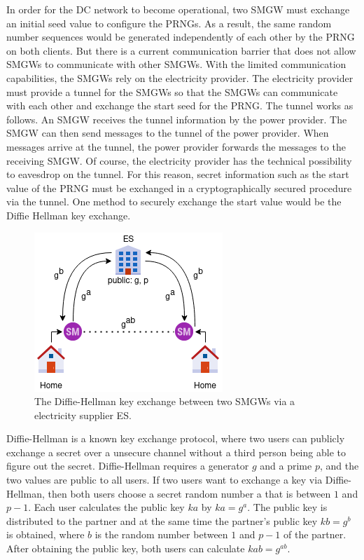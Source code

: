 In order for the DC network to become operational, two \gls{SMGW} must exchange an initial seed value to configure the PRNGs. %
As a result, the same random number sequences would be generated independently of each other by the PRNG on both clients. But there is a current communication barrier that does not allow \gls{SMGW}s to communicate with other \gls{SMGW}s. With the limited communication capabilities, the \gls{SMGW}s rely on the electricity provider. The electricity provider must provide a tunnel for the \gls{SMGW}s so that the \gls{SMGW}s can communicate with each other and exchange the start seed for the PRNG. The tunnel works as follows. An \gls{SMGW} receives the tunnel information by the power provider. The \gls{SMGW} can then send messages to the tunnel of the power provider. When messages arrive at the tunnel, the power provider forwards the messages to the receiving \gls{SMGW}. Of course, the electricity provider has the technical possibility to eavesdrop on the tunnel. For this reason, secret information such as the start value of the PRNG must be exchanged in a cryptographically secured procedure via the tunnel. One method to securely exchange the start value would be the Diffie Hellman key exchange.\\
\begin{figure}[tbp]
  \centering
  \includegraphics[scale=0.7]{images/key_exchange.png}
  \caption[Diffie-Hellman Key Exchange in TR-03109]{The Diffie-Hellman key exchange between two SMGWs via a electricity supplier \gls{ES}.}
  \label{fig:keyexchange}
\end{figure}
Diffie-Hellman is a known key exchange protocol, where two users can publicly exchange a secret over a unsecure channel without a third person being able to figure out the secret. 
Diffie-Hellman requires a generator $g$ and a prime $p$, and the two values are public to all users. If two users want to exchange a key via Diffie-Hellman, then both users choose a secret random number a that is between $1$ and $p-1$. Each user calculates the public key $ka$ by $ka=g^a$. The public key is distributed to the partner and at the same time the partner's public key $kb=g^b$ is obtained, where $b$ is the random number between $1$ and $p-1$ of the partner. After obtaining the public key, both users can calculate $kab=g^{ab}$.%
